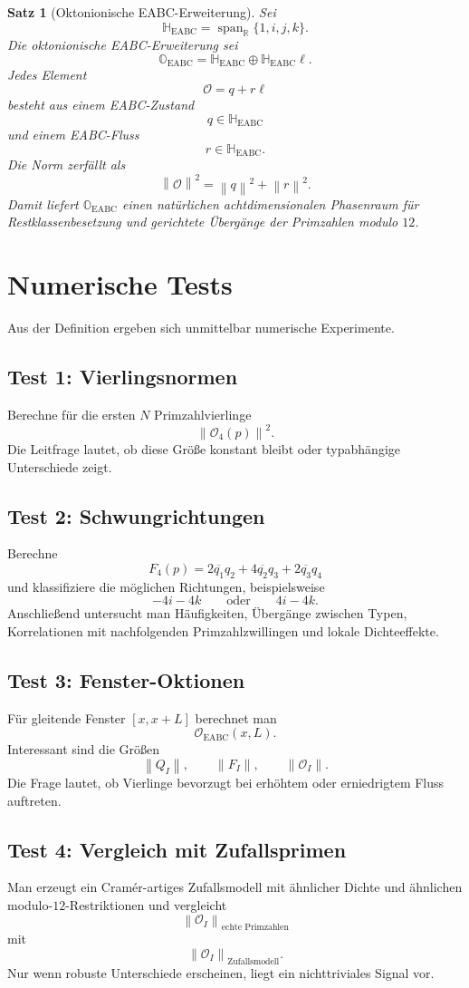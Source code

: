 \documentclass[11pt,a4paper]{article}
\theoremstyle{definition}
\theoremstyle{plain}
\newtheorem{satz}[definition]{Satz}
\newcommand{\R}{\mathbb{R}}
\newcommand{\HH}{\mathbb{H}}
\newcommand{\OO}{\mathbb{O}}
\newcommand{\EABC}{\mathrm{EABC}}
\newcommand{\norm}[1]{\left\lVert #1 \right\rVert}
\newcommand{\conj}[1]{\overline{#1}}
\newcommand{\Span}{\operatorname{span}}
\begin{document}
	\begin{satz}[Oktonionische EABC-Erweiterung]
		Sei
		\[
		\HH_{\EABC}=\Span_{\R}\{1,i,j,k\}.
		\]
		Die oktonionische EABC-Erweiterung sei
		\[
		\OO_{\EABC}=\HH_{\EABC}\oplus\HH_{\EABC}\ell.
		\]
		Jedes Element
		\[
		\mathcal O=q+r\ell
		\]
		besteht aus einem EABC-Zustand
		\[
		q\in\HH_{\EABC}
		\]
		und einem EABC-Fluss
		\[
		r\in\HH_{\EABC}.
		\]
		Die Norm zerfällt als
		\[
		\norm{\mathcal O}^2=\norm q^2+\norm r^2.
		\]
		Damit liefert $\OO_{\EABC}$ einen natürlichen achtdimensionalen Phasenraum für Restklassenbesetzung und gerichtete Übergänge der Primzahlen modulo $12$.
	\end{satz}
	
	\section{Numerische Tests}
	
	Aus der Definition ergeben sich unmittelbar numerische Experimente.
	
	\subsection{Test 1: Vierlingsnormen}
	Berechne für die ersten $N$ Primzahlvierlinge
	\[
	\norm{\mathcal O_4(p)}^2.
	\]
	Die Leitfrage lautet, ob diese Größe konstant bleibt oder typabhängige Unterschiede zeigt.
	
	\subsection{Test 2: Schwungrichtungen}
	Berechne
	\[
	F_4(p)
	=
	2\conj{q_1}q_2
	+4\conj{q_2}q_3
	+2\conj{q_3}q_4
	\]
	und klassifiziere die möglichen Richtungen, beispielsweise
	\[
	-4i-4k
	\qquad\text{oder}\qquad
	4i-4k.
	\]
	Anschließend untersucht man Häufigkeiten, Übergänge zwischen Typen, Korrelationen mit nachfolgenden Primzahlzwillingen und lokale Dichteeffekte.
	
	\subsection{Test 3: Fenster-Oktionen}
	Für gleitende Fenster $[x,x+L]$ berechnet man
	\[
	\mathcal O_{\EABC}(x,L).
	\]
	Interessant sind die Größen
	\[
	\norm{Q_I},
	\qquad
	\norm{F_I},
	\qquad
	\norm{\mathcal O_I}.
	\]
	Die Frage lautet, ob Vierlinge bevorzugt bei erhöhtem oder erniedrigtem Fluss auftreten.
	
	\subsection{Test 4: Vergleich mit Zufallsprimen}
	Man erzeugt ein Cram\'er-artiges Zufallsmodell mit ähnlicher Dichte und ähnlichen modulo-$12$-Restriktionen und vergleicht
	\[
	\norm{\mathcal O_I}_{\text{echte Primzahlen}}
	\]
	mit
	\[
	\norm{\mathcal O_I}_{\text{Zufallsmodell}}.
	\]
	Nur wenn robuste Unterschiede erscheinen, liegt ein nichttriviales Signal vor.
	
\end{document}
